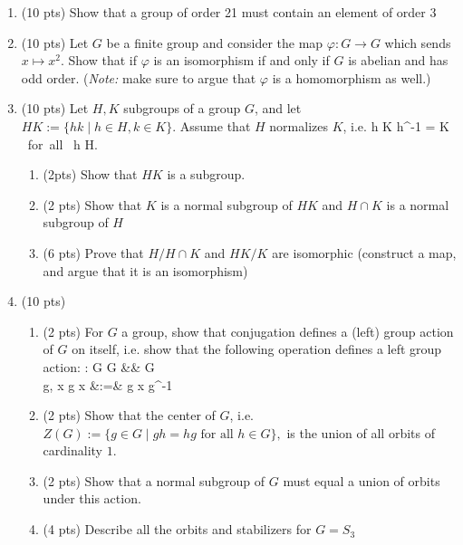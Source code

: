 \documentclass[11pt,reqno]{amsart}
\newcommand{\rr}{\rightarrow}
\begin{document}
\begin{enumerate}

\item (10 pts) Show that a group of order 21 must contain an element of order $3$
	
	


\vspace{0.15in} 

\item (10 pts) Let $G$ be a finite group and consider the map $\varphi: G \rr G$ which sends $x \mapsto x^2$. Show that if $\varphi$ is an isomorphism if and only if $G$ is abelian and has odd order. (\textit{Note:} make sure to argue that $\varphi$ is a homomorphism as well.)

\vspace{0.15in} 


\item (10 pts) Let $H, K$ subgroups of a group $G$, and let $HK:= \{ hk \mid h \in H, k \in K \}.$ Assume that $H$ normalizes $K$, i.e. \be h K h^{-1} = K \mbox{ for all } h \in H. \ee
\begin{enumerate}
	\item (2pts) Show that $HK$ is a subgroup. 
	\item (2 pts) Show that $K$ is a normal subgroup of $HK$ and $H \cap K$ is a normal subgroup of $H$
	
	\item (6 pts) Prove that $H/H \cap K$ and $HK/K$ are isomorphic (construct a map, and argue that it is an isomorphism)
\end{enumerate}

\vspace{0.15in}

\item (10 pts) 

\begin{enumerate}
	\item (2 pts) For $G$ a group, show that conjugation defines a (left) group action of $G$ on itself, i.e. show that the following operation defines a left group action: \be \star: G \times G &\rr& G \\   g, x \mapsto g \star x &:=& g x g^{-1} \ee 

	\item (2 pts) Show that the center of $G$, i.e. $Z(G):= \{ g \in G \mid gh =hg \mbox{ for all } h \in G \},$ is the union of all orbits of cardinality $1$. 
	
	\item (2 pts) Show that a normal subgroup of $G$ must equal a union of orbits under this action. 
	
	\item(4 pts) Describe all the orbits and stabilizers for $G=S_3$ 
	
\end{enumerate}	





\end{enumerate}
\end{document}
